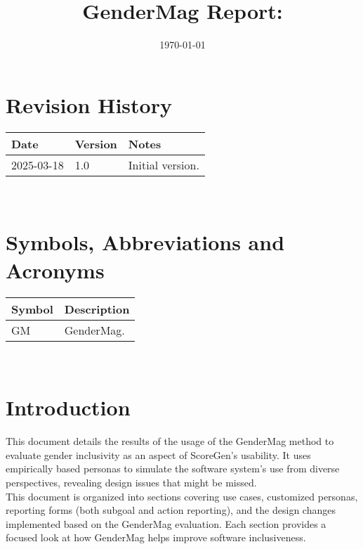 \documentclass[12pt, titlepage]{article}
\begin{document}
\title{GenderMag Report: \progname} 
\author{\authname}
\date{\today}
	
\maketitle


\section{Revision History}

\begin{tabularx}{\textwidth}{p{3cm}p{2cm}X}
\toprule {\bf Date} & {\bf Version} & {\bf Notes}\\
\midrule
2025-03-18 & 1.0 & Initial version.\\
\bottomrule
\end{tabularx}

~\newpage

\section{Symbols, Abbreviations and Acronyms}

\renewcommand{\arraystretch}{1.2}
\begin{table}[h!]
  \vspace{5pt}
  \begin{tabular}{l l} 
    \toprule		
    \textbf{Symbol} & \textbf{Description} \\
    \midrule 
    GM & GenderMag. \\
    \bottomrule
  \end{tabular}\\
\end{table}
\newpage

\tableofcontents

\newpage

\newpage

\section{Introduction} %
This document details the results of the usage of the GenderMag method to evaluate gender
inclusivity as an aspect of ScoreGen's usability. It uses empirically based personas to simulate
the software system's use from diverse perspectives, revealing design issues that might be missed.\\
This document is organized into sections covering use cases, customized personas, reporting forms 
(both subgoal and action reporting), and the design changes implemented based on the GenderMag 
evaluation. Each section provides a focused look at how GenderMag helps improve software 
inclusiveness.
\end{document}
